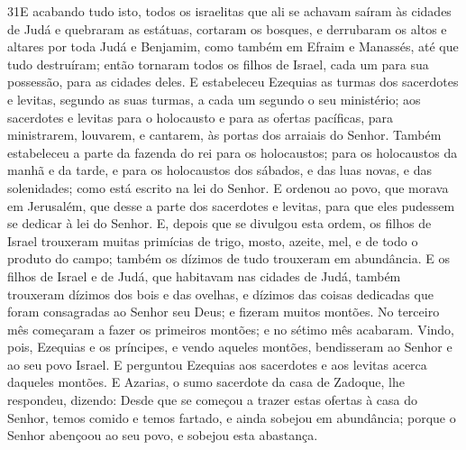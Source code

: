 \lettrine{31} E acabando tudo isto, todos os israelitas que
ali se achavam saíram às cidades de Judá e quebraram as estátuas,
cortaram os bosques, e derrubaram os altos e altares por toda Judá e
Benjamim, como também em Efraim e Manassés, até que tudo destruíram;
então tornaram todos os filhos de Israel, cada um para sua
possessão, para as cidades deles. E estabeleceu Ezequias as
turmas dos sacerdotes e levitas, segundo as suas turmas, a cada um
segundo o seu ministério; aos sacerdotes e levitas para o holocausto
e para as ofertas pacíficas, para ministrarem, louvarem, e cantarem,
às portas dos arraiais do Senhor. Também estabeleceu a parte da
fazenda do rei para os holocaustos; para os holocaustos da manhã e
da tarde, e para os holocaustos dos sábados, e das luas novas, e das
solenidades; como está escrito na lei do Senhor. E ordenou ao
povo, que morava em Jerusalém, que desse a parte dos sacerdotes e
levitas, para que eles pudessem se dedicar à lei do Senhor. E,
depois que se divulgou esta ordem, os filhos de Israel trouxeram
muitas primícias de trigo, mosto, azeite, mel, e de todo o produto
do campo; também os dízimos de tudo trouxeram em abundância. E
os filhos de Israel e de Judá, que habitavam nas cidades de Judá,
também trouxeram dízimos dos bois e das ovelhas, e dízimos das
coisas dedicadas que foram consagradas ao Senhor seu Deus; e fizeram
muitos montões. No terceiro mês começaram a fazer os primeiros
montões; e no sétimo mês acabaram. Vindo, pois, Ezequias e os
príncipes, e vendo aqueles montões, bendisseram ao Senhor e ao seu
povo Israel. E perguntou Ezequias aos sacerdotes e aos levitas
acerca daqueles montões. E Azarias, o sumo sacerdote da casa
de Zadoque, lhe respondeu, dizendo: Desde que se começou a trazer
estas ofertas à casa do Senhor, temos comido e temos fartado, e
ainda sobejou em abundância; porque o Senhor abençoou ao seu povo, e
sobejou esta abastança.

